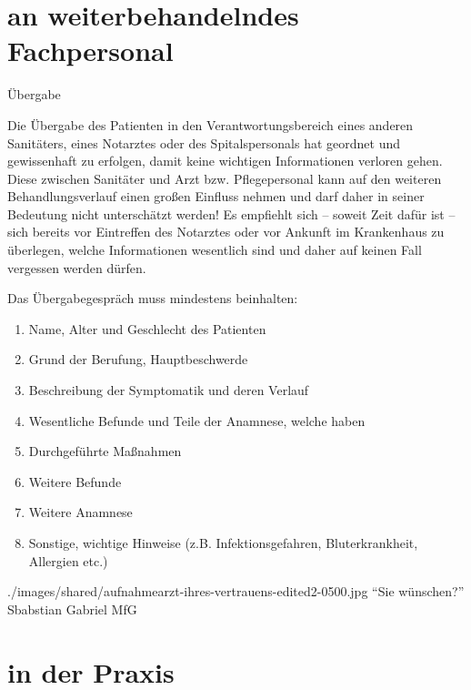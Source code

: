 \clearpage %
\section{ an weiterbehandelndes Fachpersonal}  

\TextSlideTeaser
{Übergabe}%
{%
Die Übergabe des Patienten in den Verantwortungsbereich
eines anderen Sanitäters, eines Notarztes oder des
Spitalspersonals hat geordnet und gewissenhaft zu erfolgen,
damit keine wichtigen Informationen verloren gehen. Diese
 zwischen Sanitäter und Arzt bzw.
Pflegepersonal kann auf den weiteren Behandlungsverlauf
einen großen Einfluss nehmen und darf daher in seiner
Bedeutung nicht unterschätzt werden! Es empfiehlt sich --
soweit Zeit dafür ist -- sich bereits vor Eintreffen des
Notarztes oder vor Ankunft im Krankenhaus zu überlegen, welche
Informationen wesentlich sind und daher auf keinen Fall
vergessen werden dürfen.

\bigskip\noindent Das Übergabegespräch muss mindestens
 beinhalten:
\begin{enumerate}
    \item Name, Alter und Geschlecht des
    Patienten
    \item Grund der Berufung, Hauptbeschwerde
    \item Beschreibung der Symptomatik und deren Verlauf
    \item Wesentliche Befunde und Teile der Anamnese, welche
     haben
    \item Durchgeführte Maßnahmen
    \item Weitere Befunde 
    \item Weitere Anamnese
    \item Sonstige, wichtige Hinweise (z.B. Infektionsgefahren,
    Bluterkrankheit, Allergien etc.)
\end{enumerate}}%
{}%
{./images/shared/aufnahmearzt-ihres-vertrauens-edited2-0500.jpg}%
{\enquote{Sie wünschen?}}%
{}%
{Sbabstian Gabriel}%
{MfG}%



\section{ in der Praxis}


